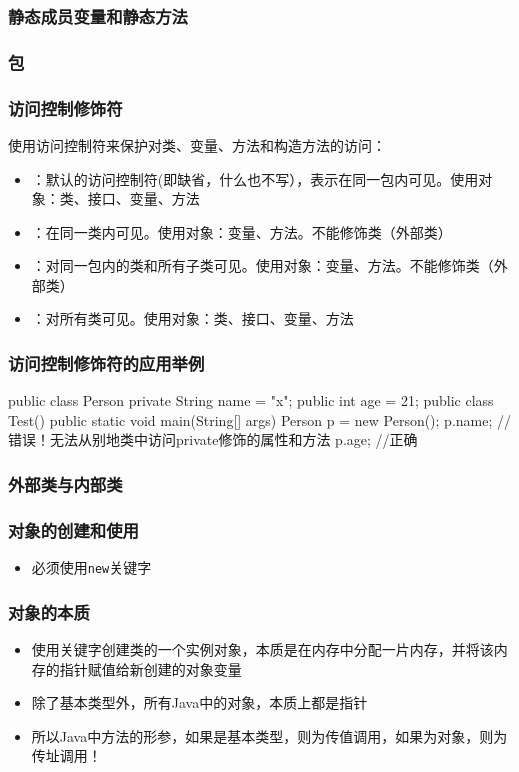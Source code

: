 \begin{frame}
  \frametitle{静态成员变量和静态方法}
\end{frame}

\begin{frame}
  \frametitle{包}
\end{frame}

\begin{frame}
  \frametitle{访问控制修饰符}
  使用访问控制符来保护对类、变量、方法和构造方法的访问：
  \begin{itemize}
    \item {}：默认的访问控制符(即缺省，什么也不写），表示在同一包内可见。使用对象：类、接口、变量、方法
    \item {}：在同一类内可见。使用对象：变量、方法。不能修饰类（外部类）
    \item {}：对同一包内的类和所有子类可见。使用对象：变量、方法。不能修饰类（外部类）
    \item {}：对所有类可见。使用对象：类、接口、变量、方法
  \end{itemize}
\end{frame}

\begin{frame}[fragile]
  \frametitle{访问控制修饰符的应用举例}
  \begin{javacode}
  public class Person {
    private String name = "x";
    public int age = 21;
  }  
  public class Test() {
     public static void main(String[] args) {
        Person p = new Person();
        p.name; //错误！无法从别地类中访问private修饰的属性和方法
        p.age; //正确
      } 
  }
  \end{javacode}

\end{frame}

\begin{frame}
  \frametitle{外部类与内部类}
\end{frame}

\begin{frame}
  \frametitle{对象的创建和使用}
  \begin{itemize}
    \item 必须使用\texttt{new}关键字
  \end{itemize}
\end{frame}

\begin{frame}
  \frametitle{对象的本质}
  \begin{itemize}
    \item 使用关键字创建类的一个实例对象，本质是在内存中分配一片内存，并将该内存的指针赋值给新创建的对象变量
    \item 除了基本类型外，所有Java中的对象，本质上都是指针
    \item 所以Java中方法的形参，如果是基本类型，则为传值调用，如果为对象，则为传址调用！
  \end{itemize}
\end{frame}

